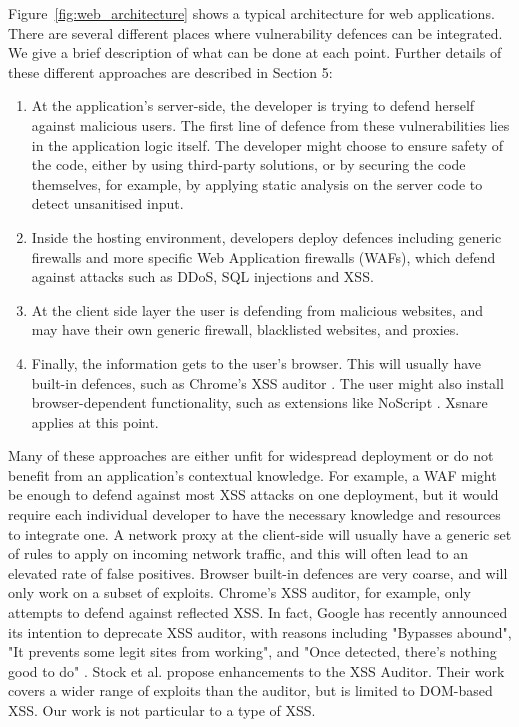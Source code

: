 Figure~\ref{fig:web_architecture} shows a typical architecture for web
applications. There are several different places where vulnerability
defences can be integrated. We give a brief description of what can be
done at each point. Further details of these different approaches are
described in Section 5:
\begin{enumerate}
	\item At the application's server-side, the developer is
          trying to defend herself against malicious users. The first
          line of defence from these vulnerabilities lies in the
          application logic itself. The developer might choose to
          ensure safety of the code, either by using third-party
          solutions, or by securing the code themselves, for example,
          by applying static analysis on the server code to detect
          unsanitised input.
	\item Inside the hosting environment, developers deploy
          defences including generic firewalls and more specific Web
          Application firewalls (WAFs), which defend against attacks
          such as DDoS, SQL injections and XSS.
	\item At the client side layer the user is defending from
          malicious websites, and may have their own generic firewall,
          blacklisted websites, and proxies.
	\item Finally, the information gets to the user's
          browser. This will usually have built-in defences, such as
          Chrome's XSS auditor \cite{xssauditor}. The user might also
          install browser-dependent functionality, such as extensions
          like NoScript \cite{Noscript}. Xsnare applies at this point.
\end{enumerate}

Many of these approaches are either unfit for widespread deployment or
do not benefit from an application's contextual knowledge. For
example, a WAF might be enough to defend against most XSS attacks on
one deployment, but it would require each individual developer to have
the necessary knowledge and resources to integrate one. A network
proxy at the client-side will usually have a generic set of rules to
apply on incoming network traffic, and this will often lead to an
elevated rate of false positives. Browser built-in defences are very
coarse, and will only work on a subset of exploits. Chrome's XSS
auditor, for example, only attempts to defend against reflected
XSS. In fact, Google has recently announced its intention to deprecate
XSS auditor, with reasons including "Bypasses abound", "It prevents
some legit sites from working", and "Once detected, there’s nothing
good to do" \cite{deprecatexssauditor}. Stock et
al. \cite{Stock:2017:WTI:3241189.3241265} propose enhancements to the
XSS Auditor. Their work covers a wider range of exploits than the
auditor, but is limited to DOM-based XSS. Our work is not particular
to a type of XSS.

